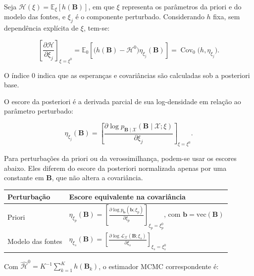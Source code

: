 \documentclass[11pt]{article}
\newcounter{none}
\begin{document}
Seja \(\mathcal H(\xi)=\mathbb E_{\xi}[h(\mathbf B)]\), em que \(\xi\)
representa os parâmetros da priori e do modelo das fontes, e \(\xi_j\) é
o componente perturbado. Considerando \(h\) fixa, sem dependência
explícita de \(\xi\), tem-se:

\[\left[
\frac{\partial \mathcal H}{\partial \xi_j}
\right]_{\xi=\xi^{0}}
=
\mathbb E_{0}
\left[
\big(h(\mathbf B)-\mathcal H^{0}\big)
\eta_{\xi_j}(\mathbf B)
\right]
=
\operatorname{Cov}_{0}
\big(h,\eta_{\xi_j}\big).\]

O índice \(0\) indica que as esperanças e covariâncias são calculadas
sob a posteriori base.

O escore da posteriori é a derivada parcial de sua log-densidade em
relação ao parâmetro perturbado:

\[\eta_{\xi_j}(\mathbf B)
=
\left[
\frac{\partial
\log p_{\mathbf B\mid\mathcal X}
(\mathbf B\mid\mathcal X;\xi)}
{\partial \xi_j}
\right]_{\xi=\xi^{0}}.\]

Para perturbações da priori ou da verossimilhança, podem-se usar os
escores abaixo. Eles diferem do escore da posteriori normalizada apenas
por uma constante em \(\mathbf B\), que não altera a covariância.

{\def\LTcaptype{none} %
\begin{longtable}[]{@{}
  >{\raggedright\arraybackslash}p{}
  >{\raggedright\arraybackslash}p{}@{}}
\toprule\noalign{}
\begin{minipage}[b]{\linewidth}\raggedright
Perturbação
\end{minipage} & \begin{minipage}[b]{\linewidth}\raggedright
Escore equivalente na covariância
\end{minipage} \\
\midrule\noalign{}
\endhead
\bottomrule\noalign{}
\endlastfoot
Priori &
\(\eta_{\xi_p}(\mathbf B)=\left[\frac{\partial \log p_{\mathbf b}(\mathbf b;\xi_p)}{\partial \xi_p}\right]_{\xi_p=\xi_p^{0}}\),
com \(\mathbf b=\mathrm{vec}(\mathbf B)\) \\
Modelo das fontes &
\(\eta_{\xi_s}(\mathbf B)=\left[\frac{\partial \log \mathcal L_{\mathcal X}(\mathbf B;\xi_s)}{\partial \xi_s}\right]_{\xi_s=\xi_s^{0}}\) \\
\end{longtable}
}

Com \(\hat{\mathcal H}^{0}=K^{-1}\sum_{k=1}^{K}h(\mathbf B_k)\), o
estimador MCMC correspondente é:
\end{document}
